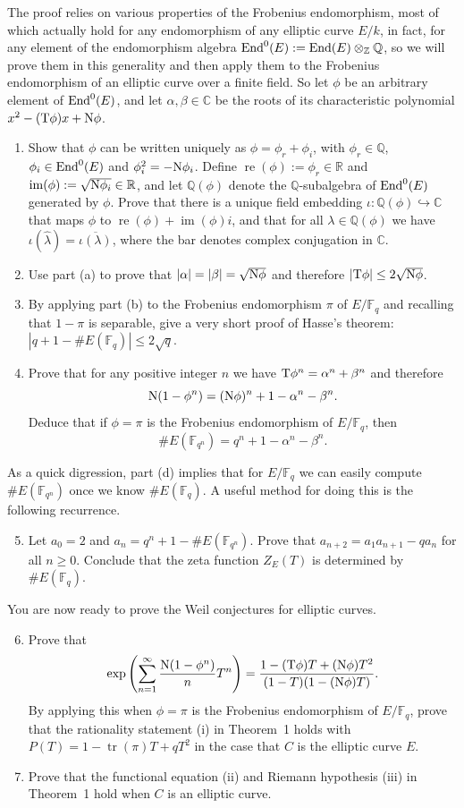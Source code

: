 \documentclass[11pt]{article}
\newcommand{\Fq}{\mathbb{F}_q}
\newcommand{\Fqn}{\mathbb{F}_{q^n}}
\newcommand{\Q}{\mathbb{Q}}
\newcommand{\R}{\mathbb{R}}
\newcommand{\C}{\mathbb{C}}
\newcommand{\Z}{\mathbb{Z}}
\newcommand{\End}{{\rm End}}
\newcommand{\tr}{\operatorname{tr}}
\newcommand{\T}{{\rm T}}
\newcommand{\N}{{\rm N}}
\newcommand{\re}{\operatorname{re}}
\newcommand{\im}{\operatorname{im}}
\begin{document}
The proof relies on various properties of the Frobenius endomorphism, most of which actually hold for any endomorphism of any elliptic curve $E/k$, in fact, for any element of the endomorphism algebra $\End^0(E):=\End(E)\otimes_\Z \Q$, so we will prove them in this generality and then apply them to the Frobenius endomorphism of an elliptic curve over a finite field.
So let $\phi$ be an arbitrary element of $\End^0(E)$, and let $\alpha,\beta\in\C$ be the roots of its characteristic polynomial
$x^2-(\T\phi)x + \N\phi$.

\begin{enumerate}[{\bf (a)}]
\item
Show that $\phi$ can be written uniquely as $\phi=\phi_r+\phi_i$, with $\phi_r\in\Q$, $\phi_i\in\End^0(E)$ and $\phi_i^2=-\N\phi_i$.
Define $\re(\phi):=\phi_r\in\R$ and $\im(\phi):=\sqrt{\N\phi_i}\in\R$, and let $\Q(\phi)$ denote the $\Q$-subalgebra of $\End^0(E)$ generated by $\phi$.
Prove that there is a unique field embedding $\iota\colon\Q(\phi)\hookrightarrow\C$ that maps $\phi$ to $\re(\phi)+\im(\phi)i$, and that for all $\lambda\in\Q(\phi)$ we have $\iota(\hat\lambda) = \overline{\iota(\lambda)}$, where the bar denotes complex conjugation in $\C$.
\item
Use part (a) to prove that $|\alpha|=|\beta|=\sqrt{\N\phi}$ and therefore $|\T\phi|\le 2\sqrt{\N\phi}$.
\item
By applying part (b) to the Frobenius endomorphism $\pi$ of $E/\Fq$ and recalling that $1-\pi$ is separable,
give a very short proof of Hasse's theorem: $|q+1-\#E(\Fq)|\le 2\sqrt{q}$.
\item
Prove that for any positive integer $n$ we have $\T\phi^n=\alpha^n+\beta^n$ and therefore
\[
\N(1-\phi^n) = (\N\phi)^n + 1 -\alpha^n-\beta^n.
\]
Deduce that if $\phi=\pi$ is the Frobenius endomorphism of $E/\Fq$, then $$\#E(\Fqn)=q^n+1-\alpha^n-\beta^n.$$
\end{enumerate}
As a quick digression, part (d) implies that for $E/\Fq$ we can easily compute $\#E(\Fqn)$ once we know $\#E(\Fq)$.
A useful method for doing this is the following recurrence.
\begin{enumerate}[{\bf (a)}]
\setcounter{enumi}{4}
\item
Let $a_0=2$ and $a_n=q^n+1-\#E(\Fqn)$.  Prove that $a_{n+2}=a_1a_{n+1}-qa_n$ for all $n\ge 0$.
Conclude that the zeta function $Z_E(T)$ is determined by $\#E(\Fq)$.
\end{enumerate}
You are now ready to prove the Weil conjectures for elliptic curves.
\begin{enumerate}[{\bf (a)}]
\setcounter{enumi}{5}
\item
Prove that
\[
\exp\left(\sum_{n=1}^\infty\frac{\N(1-\phi^n)}{n}T^n\right) = \frac{1-(\T\phi)T+(\N\phi)T^2}{(1-T)(1-(\N\phi)T)}.
\]
By applying this when $\phi=\pi$ is the Frobenius endomorphism of $E/\Fq$, prove that the rationality statement (i) in Theorem~1 holds with $P(T)=1-\tr(\pi)T+qT^2$ in the case that $C$ is the elliptic curve $E$.
\item
Prove that the functional equation (ii) and Riemann hypothesis (iii) in Theorem~1 hold when $C$ is an elliptic curve.
\end{enumerate}
\end{document}
